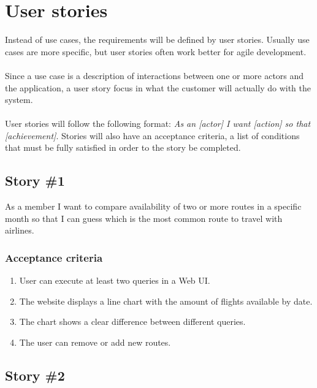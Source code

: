\section{User stories}

Instead of use cases, the requirements will be defined by user stories. Usually use cases are more specific, but user stories often work better for agile development.
\\\\
Since a use case is a description of interactions between one or more actors and the application, a user story focus in what the customer will actually do with the system.
\\\\
User stories will follow the following format: \textit{As an [actor] I want [action] so that [achievement]}. Stories will also have an acceptance criteria, a list of conditions that must be fully satisfied in order to the story be completed.

\subsection*{Story \#1}

\begin{displayquote}
As a  member I want to compare availability of two or more routes in a specific month so that I can guess which is the most common route to travel with airlines.
\end{displayquote}

\subsubsection*{Acceptance criteria}

\begin{enumerate}
    \item User can execute at least two queries in a Web UI.
    \item The website displays a line chart with the amount of flights available by date.
    \item The chart shows a clear difference between different queries.
    \item The user can remove or add new routes.
\end{enumerate}

\subsection*{Story \#2}

